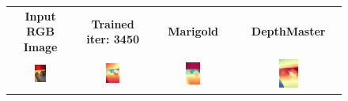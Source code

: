 \documentclass{article}
\begin{document}
\begin{figure}[H]
  \centering
  \begin{tabular}{cccc}
    \textbf{Input RGB Image} & \textbf{Trained iter: 3450} & \textbf{Marigold} & \textbf{DepthMaster} \\
    \includegraphics[width=0.2\textwidth]{images/test-image/inside-02.jpg} &
    \includegraphics[width=0.2\textwidth]{images/trained/inside-02_pred_colored.png} &
    \includegraphics[width=0.2\textwidth]{images/pretrained/inside-02_pred_colored.png} &
    \includegraphics[width=0.2\textwidth]{images/depthmaster/inside-02_pred_colored.jpg} \\


\end{tabular}
\end{figure}
\end{document}
